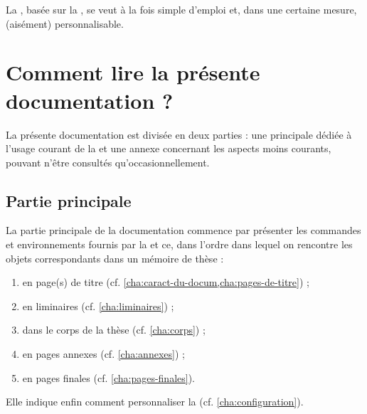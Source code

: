 La \yatcl{}, basée sur la , se veut à la fois simple d'emploi et,
dans une certaine mesure, (aisément) personnalisable.


\section{Comment lire la présente documentation ?}
\label{sec:comment-lire-cette}

La présente documentation est divisée en deux parties : une principale dédiée
à l'usage courant de la \yatcl{} et une annexe concernant les aspects moins
courants, pouvant n'être consultés qu'occasionnellement.

\subsection{Partie principale}
\label{sec:partie-principale}

La partie principale de la documentation commence par présenter les commandes
et environnements fournis par la \yatcl{} et ce, dans l'ordre dans lequel on
rencontre les objets correspondants dans un mémoire de thèse :
\begin{enumerate}
\item en page(s) de titre (cf. \vref{cha:caract-du-docum,cha:pages-de-titre}) ;
\item en \glspl{liminaire} (cf. \vref{cha:liminaires}) ;
\item dans le corps de la thèse (cf. \vref{cha:corps}) ;
\item en pages annexes (cf. \vref{cha:annexes}) ;
\item en pages finales (cf. \vref{cha:pages-finales}).
\end{enumerate}
Elle indique enfin comment personnaliser la \yatcl{}
(cf. \vref{cha:configuration}).

